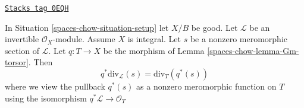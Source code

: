 \begin{lemma}
\label{spaces-chow-lemma-Gm-torsor-divisor-meromorphic-section}
\href{https://stacks.math.columbia.edu/tag/0EQH}{\texttt{Stacks tag 0EQH}}

In Situation \ref{spaces-chow-situation-setup} let $X/B$ be good.
Let $\mathcal{L}$ be an invertible $\mathcal{O}_X$-module.
Assume $X$ is integral. Let $s$ be a nonzero meromorphic
section of $\mathcal{L}$. Let $q : T \to X$ be the morphism
of Lemma \ref{spaces-chow-lemma-Gm-torsor}. Then
$$
q^*\text{div}_\mathcal{L}(s) = \text{div}_T(q^*(s))
$$
where we view the pullback $q^*(s)$
as a nonzero meromorphic function on $T$
using the isomorphism $q^*\mathcal{L} \to \mathcal{O}_T$
\end{lemma}

